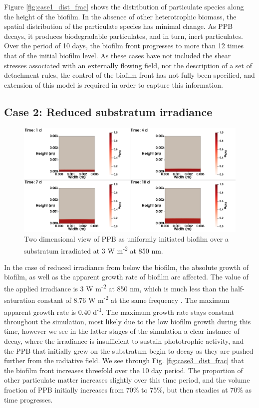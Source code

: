  Figure \ref{fig:case1_dist_frac} shows the distribution of particulate species along the height of the biofilm. In the absence of other heterotrophic biomass, the spatial distribution of the particulate species has minimal change. As PPB decays, it produces biodegradable particulates, and in turn, inert particulates. Over the period of 10 days, the biofilm front progresses to more than 12 times that of the initial biofilm level. As these cases have not included the shear stresses associated with an externally flowing field, nor the description of a set of detachment rules, the control of the biofilm front has not fully been specified, and extension of this model is required in order to capture this information. 





\subsection{Case 2: Reduced substratum irradiance}
\begin{figure}[H]
    \centering
     \hspace*{-1cm}\includegraphics[width=1.1\textwidth,height=0.4\textheight]{Chap4/methods/data/figures/case3_ppb_frac.png}
    \caption{Two dimensional view of PPB as uniformly initiated biofilm over a substratum irradiated at 3 W m\textsuperscript{-2} at 850 nm.} 
    \label{fig:case3_ppb_frac}
\end{figure}

In the case of reduced irradiance from below the biofilm, the absolute growth of biofilm, as well as the apparent growth rate of biofilm are affected. The value of the applied irradiance is 3 W m\textsuperscript{-2} at 850 nm, which is much less than the half-saturation constant of 8.76 W m\textsuperscript{-2} at the same frequency \cite{eltsova2016}. The maximum apparent growth rate is 0.40 d\textsuperscript{-1}. The maximum growth rate stays constant throughout the simulation, most likely due to the low biofilm growth during this time, however we see in the latter stages of the simulation a clear instance of decay, where the irradiance is insufficient to sustain phototrophic activity, and the PPB that initially grew on the substratum begin to decay  as they are pushed further from the radiative field. We see through Fig. \ref{fig:case3_dist_frac} that the biofilm front increases threefold over the 10 day period. The proportion of other particulate matter increases slightly over this time period, and the volume fraction of PPB initially increases from 70\% to 75\%, but then steadies at 70\% as time progresses. 

